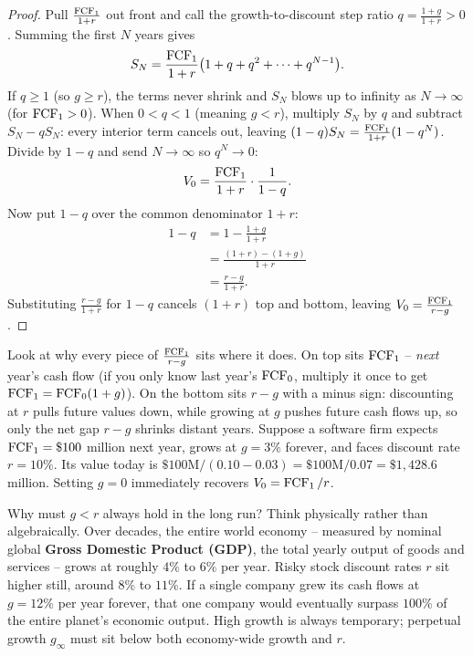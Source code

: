 \begin{proof}
Pull $\frac{\operatorname{FCF}_1}{1+r}$ out front and call the growth-to-discount step ratio $q = \frac{1+g}{1+r} > 0$. Summing the first $N$ years gives
\[
 S_N = \frac{\operatorname{FCF}_1}{1+r}\bigl(1 + q + q^2 + \dots + q^{N-1}\bigr).
\]
If $q \ge 1$ (so $g \ge r$), the terms never shrink and $S_N$ blows up to infinity as $N \to \infty$ (for $\operatorname{FCF}_1 > 0$). When $0 < q < 1$ (meaning $g < r$), multiply $S_N$ by $q$ and subtract $S_N - q S_N$: every interior term cancels out, leaving $(1 - q)S_N = \frac{\operatorname{FCF}_1}{1+r}(1 - q^N)$. Divide by $1 - q$ and send $N \to \infty$ so $q^N \to 0$:
\[
 V_0 = \frac{\operatorname{FCF}_1}{1+r} \cdot \frac{1}{1 - q}.
\]
Now put $1 - q$ over the common denominator $1 + r$:
\begin{align*}
  1 - q &= 1 - \frac{1+g}{1+r} \\
        &= \frac{(1+r) - (1+g)}{1+r} \\
        &= \frac{r - g}{1+r}.
\end{align*}
Substituting $\frac{r-g}{1+r}$ for $1 - q$ cancels $(1+r)$ top and bottom, leaving $V_0 = \frac{\operatorname{FCF}_1}{r - g}$.
\end{proof}

Look at why every piece of $\frac{\operatorname{FCF}_1}{r - g}$ sits where it does. On top sits $\operatorname{FCF}_1$ -- \emph{next} year's cash flow (if you only know last year's $\operatorname{FCF}_0$, multiply it once to get $\operatorname{FCF}_1 = \operatorname{FCF}_0(1+g)$). On the bottom sits $r - g$ with a minus sign: discounting at $r$ pulls future values down, while growing at $g$ pushes future cash flows up, so only the net gap $r - g$ shrinks distant years. Suppose a software firm expects $\operatorname{FCF}_1 = \$100$ million next year, grows at $g = 3\%$ forever, and faces discount rate $r = 10\%$. Its value today is $\$100\text{M} / (0.10 - 0.03) = \$100\text{M} / 0.07 = \$1{,}428.6$ million. Setting $g = 0$ immediately recovers $V_0 = \operatorname{FCF}_1 / r$.

\begin{happeningbox}
Why must $g < r$ always hold in the long run? Think physically rather than algebraically. Over decades, the entire world economy -- measured by nominal global \textbf{Gross Domestic Product (GDP)}, the total yearly output of goods and services -- grows at roughly $4\%$ to $6\%$ per year. Risky stock discount rates $r$ sit higher still, around $8\%$ to $11\%$. If a single company grew its cash flows at $g = 12\%$ per year forever, that one company would eventually surpass $100\%$ of the entire planet's economic output. High growth is always temporary; perpetual growth $g_\infty$ must sit below both economy-wide growth and $r$.
\end{happeningbox}

